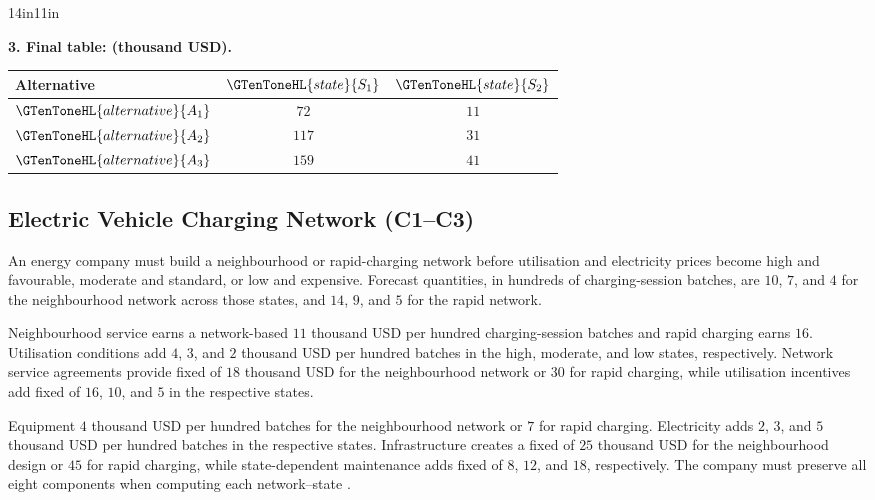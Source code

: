 \begin{CalculationLandscape}{14in}{11in}
\noindent\begin{minipage}{\linewidth}
\textbf{3. Final  table:  (thousand USD).}
\begin{center}
\begin{tabular}{@{}lcc@{}}
\toprule
Alternative & \(\GTenToneHL{state}{S_1}\) & \(\GTenToneHL{state}{S_2}\) \\
\midrule
\(\GTenToneHL{alternative}{A_1}\) & \(72\) & \(11\) \\
\(\GTenToneHL{alternative}{A_2}\) & \(117\) & \(31\) \\
\(\GTenToneHL{alternative}{A_3}\) & \(159\) & \(41\) \\
\bottomrule
\end{tabular}
\end{center}
\end{minipage}



\end{CalculationLandscape}


	\subsection{Electric Vehicle Charging Network (C1--C3)}
	\label{sec:problem21-electric-vehicle-charging-network-c1-c3}

	An energy company must build a neighbourhood or rapid-charging network before utilisation and electricity prices become high and favourable, moderate and standard, or low and expensive. Forecast quantities, in hundreds of charging-session batches, are \(10\), \(7\), and \(4\) for the neighbourhood network across those states, and \(14\), \(9\), and \(5\) for the rapid network.

	Neighbourhood service earns a network-based \(11\) thousand USD per hundred charging-session batches and rapid charging earns \(16\). Utilisation conditions add \(4\), \(3\), and \(2\) thousand USD per hundred batches in the high, moderate, and low states, respectively. Network service agreements provide fixed  of \(18\) thousand USD for the neighbourhood network or \(30\) for rapid charging, while utilisation incentives add fixed  of \(16\), \(10\), and \(5\) in the respective states.

	Equipment  \(4\) thousand USD per hundred batches for the neighbourhood network or \(7\) for rapid charging. Electricity adds \(2\), \(3\), and \(5\) thousand USD per hundred batches in the respective states. Infrastructure creates a fixed  of \(25\) thousand USD for the neighbourhood design or \(45\) for rapid charging, while state-dependent maintenance adds fixed  of \(8\), \(12\), and \(18\), respectively. The company must preserve all eight components when computing each network--state .

